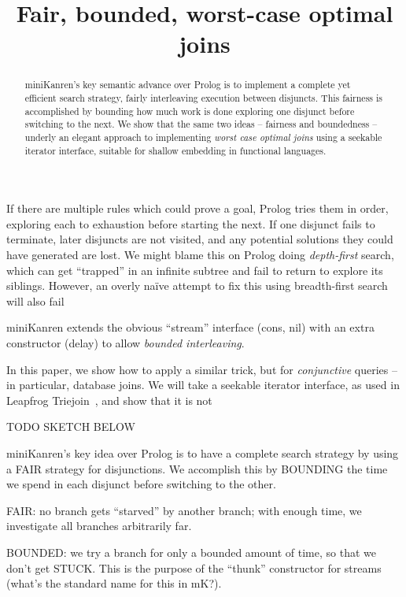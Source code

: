 \documentclass[acmsmall,screen,review,anonymous,dvipsnames]{acmart}
\title{Fair, bounded, worst-case optimal joins}
\newcommand\todo[1]{{\color{Orange}#1}}
\begin{document}
\begin{abstract}
  {miniKanren}'s key semantic advance over Prolog is to implement a complete yet efficient search strategy, fairly interleaving execution between disjuncts.
  This fairness is accomplished by bounding how much work is done exploring one disjunct before switching to the next.
  We show that the same two ideas -- fairness and boundedness -- underly an elegant approach to implementing \emph{worst case optimal joins} using a seekable iterator interface, suitable for shallow embedding in functional languages.
\end{abstract}

\maketitle

If there are multiple rules which could prove a goal, Prolog tries them in order, exploring each to exhaustion before starting the next.
If one disjunct fails to terminate, later disjuncts are not visited, and any potential solutions they could have generated are lost.
We might blame this on Prolog doing \emph{depth-first} search, which can get ``trapped'' in an infinite subtree and fail to return to explore its siblings.
However, an overly na\"ive attempt to fix this using breadth-first search will also fail


miniKanren extends the obvious ``stream'' interface (cons, nil) with an extra constructor (delay) to allow \emph{bounded interleaving}.

In this paper, we show how to apply a similar trick, but for \emph{conjunctive} queries -- in particular, database joins.
We will take a seekable iterator interface, as used in Leapfrog Triejoin~\citep{lftj}, and show that it is not

\todo{TODO SKETCH BELOW}

miniKanren's key idea over Prolog is to have a complete search strategy by using a FAIR strategy for disjunctions.
We accomplish this by BOUNDING the time we spend in each disjunct before switching to the other.

FAIR: no branch gets ``starved'' by another branch; with enough time, we investigate all branches arbitrarily far.

BOUNDED: we try a branch for only a bounded amount of time, so that we don't get STUCK. This is the purpose of the ``thunk'' constructor for streams (what's the standard name for this in mK?).
\end{document}
